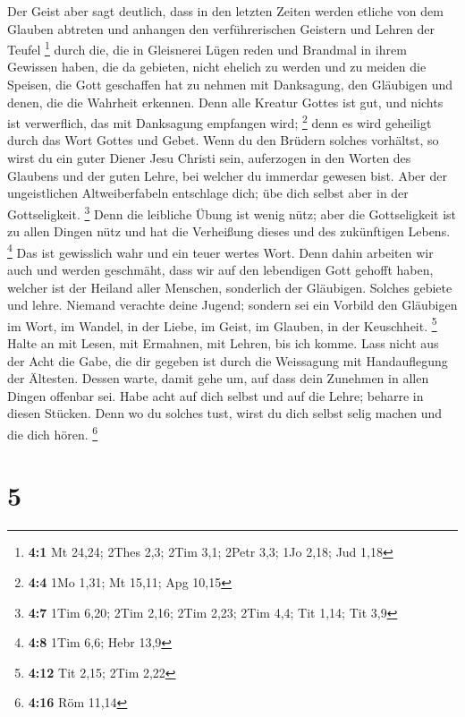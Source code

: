 Der Geist aber sagt deutlich, dass in den letzten Zeiten
werden etliche von dem Glauben abtreten und anhangen den verführerischen
Geistern und Lehren der Teufel \footnote{\textbf{4:1} Mt 24,24; 2Thes
  2,3; 2Tim 3,1; 2Petr 3,3; 1Jo 2,18; Jud 1,18}  durch
die, die in Gleisnerei Lügen reden und Brandmal in ihrem Gewissen haben,
 die da gebieten, nicht ehelich zu werden und zu meiden
die Speisen, die Gott geschaffen hat zu nehmen mit Danksagung, den
Gläubigen und denen, die die Wahrheit erkennen.  Denn alle
Kreatur Gottes ist gut, und nichts ist verwerflich, das mit Danksagung
empfangen wird; \footnote{\textbf{4:4} 1Mo 1,31; Mt 15,11; Apg 10,15}
 denn es wird geheiligt durch das Wort Gottes und Gebet.
 Wenn du den Brüdern solches vorhältst, so wirst du ein
guter Diener Jesu Christi sein, auferzogen in den Worten des Glaubens
und der guten Lehre, bei welcher du immerdar gewesen bist.
 Aber der ungeistlichen Altweiberfabeln entschlage dich;
übe dich selbst aber in der Gottseligkeit. \footnote{\textbf{4:7} 1Tim
  6,20; 2Tim 2,16; 2Tim 2,23; 2Tim 4,4; Tit 1,14; Tit 3,9}
 Denn die leibliche Übung ist wenig nütz; aber die
Gottseligkeit ist zu allen Dingen nütz und hat die Verheißung dieses und
des zukünftigen Lebens. \footnote{\textbf{4:8} 1Tim 6,6; Hebr 13,9}
 Das ist gewisslich wahr und ein teuer wertes Wort.
 Denn dahin arbeiten wir auch und werden geschmäht, dass
wir auf den lebendigen Gott gehofft haben, welcher ist der Heiland aller
Menschen, sonderlich der Gläubigen.  Solches gebiete und
lehre.  Niemand verachte deine Jugend; sondern sei ein
Vorbild den Gläubigen im Wort, im Wandel, in der Liebe, im Geist, im
Glauben, in der Keuschheit. \footnote{\textbf{4:12} Tit 2,15; 2Tim 2,22}
 Halte an mit Lesen, mit Ermahnen, mit Lehren, bis ich
komme.  Lass nicht aus der Acht die Gabe, die dir gegeben
ist durch die Weissagung mit Handauflegung der Ältesten. 
Dessen warte, damit gehe um, auf dass dein Zunehmen in allen Dingen
offenbar sei.  Habe acht auf dich selbst und auf die
Lehre; beharre in diesen Stücken. Denn wo du solches tust, wirst du dich
selbst selig machen und die dich hören. \footnote{\textbf{4:16} Röm
  11,14}

\hypertarget{section-4}{%
\section{5}\label{section-4}}

